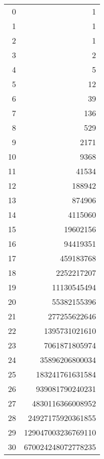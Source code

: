 \documentclass[distribution,draft]{brandiss} %
\numberwithin{section}{chapter}
\numberwithin{figure}{chapter}
\begin{document}
\begin{table}[htb]
{\begin{tabular}{r | r}
      0 & 1 \\
      1 & 1 \\
      2 & 1 \\
      3 & 2 \\
      4 & 5 \\
      5 & 12 \\
      6 & 39 \\
      7 & 136 \\
      8 & 529 \\
      9 & 2171 \\
      10 & 9368 \\
      11 & 41534 \\
      12 & 188942 \\
      13 & 874906 \\
      14 & 4115060 \\
      15 & 19602156 \\
      16 & 94419351 \\
      17 & 459183768 \\
      18 & 2252217207 \\
      19 & 11130545494 \\
      20 & 55382155396 \\
      21 & 277255622646 \\
      22 & 1395731021610 \\
      23 & 7061871805974 \\
      24 & 35896206800034 \\
      25 & 183241761631584 \\
      26 & 939081790240231 \\
      27 & 4830116366008952 \\
      28 & 24927175920361855 \\
      29 & 129047003236769110 \\
      30 & 670024248072778235
    \end{tabular}
  }
\end{table}
\end{document}
